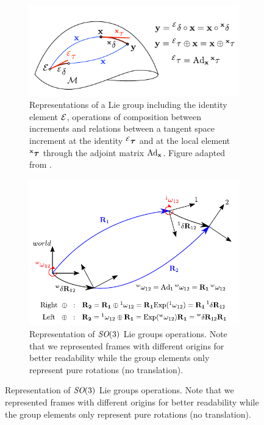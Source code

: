 \begin{figure}[h]
    \centering
    \begin{subfigure}{0.85\textwidth}
        \includegraphics[width=\textwidth]{figures/lie_group.pdf}
        \caption{Representations of a Lie group including the identity element $\mathcal{E}$, operations of composition
        between increments and relations between a tangent space increment at the identity $\prescript{\mathcal{E}}{}{{\bm \tau}}$ 
        and at the local element $\prescript{{\bf x}}{}{{\bm \tau}}$ through the adjoint matrix $\text{Ad}_{{\bf x}}$. Figure adapted from \cite{sola2018micro}.}
        \label{fig:lie_group} 
    \end{subfigure}

    \begin{subfigure}{0.85\textwidth}
        \includegraphics[width=\textwidth]{figures/rotation_exp_log.pdf}
        \caption{Representation of $\textit{SO}(3)$ Lie groups operations. Note that we represented frames with different origins
        for better readability while the group elements only represent pure rotations (no translation).}
        \label{fig:rotation_exp_log} 
    \end{subfigure}
\end{figure}

